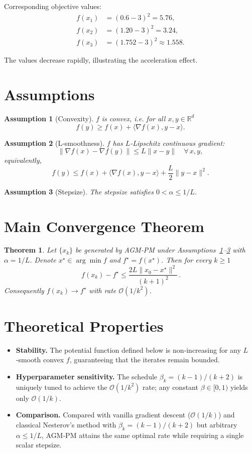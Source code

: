 \documentclass{article}
\newtheorem{theorem}{Theorem}
\newtheorem{assumption}{Assumption}
\begin{document}
Corresponding objective values:
\[
\begin{aligned}
f(x_{1}) &= (0.6-3)^{2}=5.76,\\
f(x_{2}) &= (1.20-3)^{2}=3.24,\\
f(x_{3}) &= (1.752-3)^{2}\approx 1.558.
\end{aligned}
\]

The values decrease rapidly, illustrating the acceleration effect.

\newpage
\section*{Assumptions}
\begin{assumption}[Convexity]\label{ass:conv}
$f$ is convex, i.e. for all $x,y\in\mathbb{R}^{d}$
\[
f(y)\ge f(x)+\langle\nabla f(x),y-x\rangle .
\]
\end{assumption}

\begin{assumption}[L‑smoothness]\label{ass:smooth}
$f$ has $L$‑Lipschitz continuous gradient:
\[
\|\nabla f(x)-\nabla f(y)\|\le L\|x-y\|\quad\forall\,x,y,
\]
equivalently,
\[
f(y)\le f(x)+\langle\nabla f(x),y-x\rangle+\frac{L}{2}\|y-x\|^{2}.
\]
\end{assumption}

\begin{assumption}[Stepsize]\label{ass:step}
The stepsize satisfies $0<\alpha\le 1/L$.
\end{assumption}

\section*{Main Convergence Theorem}
\begin{theorem}\label{thm:rate}
Let $\{x_{k}\}$ be generated by AGM‑PM under Assumptions~\ref{ass:conv}–\ref{ass:step} with $\alpha=1/L$.
Denote $x^{\star}\in\arg\min f$ and $f^{\star}=f(x^{\star})$.
Then for every $k\ge 1$
\[
\boxed{\,f(x_{k})-f^{\star}\le \frac{2L\|x_{0}-x^{\star}\|^{2}}{(k+1)^{2}}\, } .
\]
Consequently $f(x_{k})\to f^{\star}$ with rate $\mathcal{O}(1/k^{2})$.
\end{theorem}

\section*{Theoretical Properties}
\begin{itemize}
\item \textbf{Stability.} The potential function defined below is non‑increasing for any $L$‑smooth convex $f$, guaranteeing that the iterates remain bounded.
\item \textbf{Hyperparameter sensitivity.} The schedule $\beta_{k}=(k-1)/(k+2)$ is uniquely tuned to achieve the $\mathcal{O}(1/k^{2})$ rate; any constant $\beta\in[0,1)$ yields only $\mathcal{O}(1/k)$.
\item \textbf{Comparison.} Compared with vanilla gradient descent ($\mathcal{O}(1/k)$) and classical Nesterov’s method with $\beta_{k}=(k-1)/(k+2)$ but arbitrary $\alpha\le1/L$, AGM‑PM attains the same optimal rate while requiring a single scalar stepsize.
\end{itemize}
\end{document}
